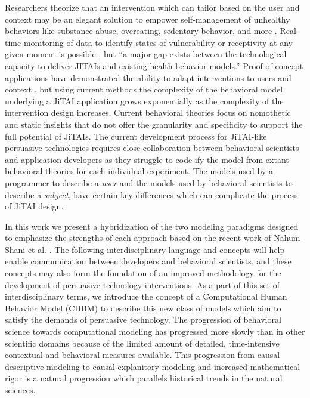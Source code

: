 \documentclass[runningheads,a4paper]{llncs}
\begin{document}
Researchers theorize that an intervention which can tailor based on the user and context may be an elegant solution to empower self-management of unhealthy behaviors like substance abuse, overeating, sedentary behavior, and more \cite{nahum2014}.
Real-time monitoring of data to identify states of vulnerability or receptivity at any given moment is possible \cite{hekler2013realizing}, but ``a major gap exists between the technological capacity to deliver JITAIs and existing health behavior models.'' \cite{nahum2014}
Proof-of-concept applications have demonstrated the ability to adapt interventions to users \cite{dallery2014optimizing, beck2010challenges} and context \cite{brailsford2010towards, collins2004conceptual}, but using current methods the complexity of the behavioral model underlying a JiTAI application grows exponentially as the complexity of the intervention design increases. 
Current behavioral theories focus on nomothetic and static insights that do not offer the granularity and specificity to support the full potential of JiTAIs\cite{riley2011healthbehavior}.
The current development process for JiTAI-like persuasive technologies requires close collaboration between behavioral scientists and application developers as they struggle to code-ify the model from extant behavioral theories for each individual experiment.
The models used by a programmer to describe a \emph{user} and the models used by behavioral scientists to describe a \emph{subject}, have certain key differences which can complicate the process of JiTAI design.

In this work we present a hybridization of the two modeling paradigms designed to emphasize the strengths of each approach based on the recent work of Nahum-Shani et al. \cite{nahum2014}.
The following interdisciplinary language and concepts will help enable communication between developers and behavioral scientists, and these concepts may also form the foundation of an improved methodology for the development of persuasive technology interventions.
As a part of this set of interdisciplinary terms, we introduce the concept of a Computational Human Behavior Model (CHBM) to describe this new class of models which aim to satisfy the demands of persuasive technology.
The progression of behavioral science towards computational modeling has progressed more slowly than in other scientific domains because of the limited amount of detailed, time-intensive contextual and behavioral measures available.
This progression from causal descriptive modeling to causal explanitory modeling and increased mathematical rigor is a natural progression which parallels historical trends in the natural sciences.
\end{document}
